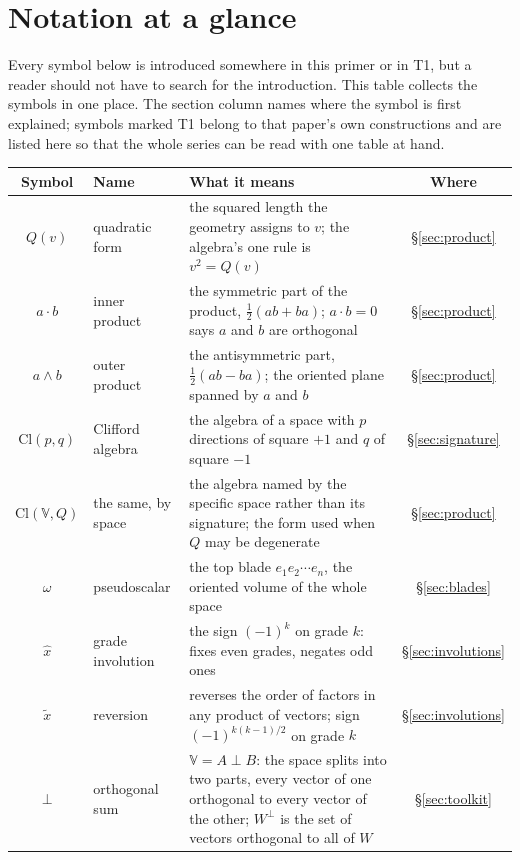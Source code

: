 \documentclass[11pt]{article}
\theoremstyle{plain}
\theoremstyle{definition}
\newcommand{\Cl}{\mathrm{Cl}}
\begin{document}
\section{Notation at a glance}\label{sec:notation}

Every symbol below is introduced somewhere in this primer or in T1, but a reader should not have to search for the introduction. This table collects the symbols in one place. The section column names where the symbol is first explained; symbols marked T1 belong to that paper's own constructions and are listed here so that the whole series can be read with one table at hand.

\begin{center}
\small
\begin{tabular}{cl>{\raggedright\arraybackslash}p{7.0cm}c}
\toprule
Symbol & Name & What it means & Where \\
\midrule
$Q(v)$ & quadratic form & the squared length the geometry assigns to $v$; the algebra's one rule is $v^2 = Q(v)$ & \S\ref{sec:product} \\
$a \cdot b$ & inner product & the symmetric part of the product, $\tfrac12(ab + ba)$; $a \cdot b = 0$ says $a$ and $b$ are orthogonal & \S\ref{sec:product} \\
$a \wedge b$ & outer product & the antisymmetric part, $\tfrac12(ab - ba)$; the oriented plane spanned by $a$ and $b$ & \S\ref{sec:product} \\
$\Cl(p,q)$ & Clifford algebra & the algebra of a space with $p$ directions of square $+1$ and $q$ of square $-1$ & \S\ref{sec:signature} \\
$\Cl(\mathbb{V}, Q)$ & the same, by space & the algebra named by the specific space rather than its signature; the form used when $Q$ may be degenerate & \S\ref{sec:product} \\
$\omega$ & pseudoscalar & the top blade $e_1 e_2 \cdots e_n$, the oriented volume of the whole space & \S\ref{sec:blades} \\
$\hat{x}$ & grade involution & the sign $(-1)^k$ on grade $k$: fixes even grades, negates odd ones & \S\ref{sec:involutions} \\
$\tilde{x}$ & reversion & reverses the order of factors in any product of vectors; sign $(-1)^{k(k-1)/2}$ on grade $k$ & \S\ref{sec:involutions} \\
$\perp$ & orthogonal sum & $\mathbb{V} = A \perp B$: the space splits into two parts, every vector of one orthogonal to every vector of the other; $W^{\perp}$ is the set of vectors orthogonal to all of $W$ & \S\ref{sec:toolkit} \\

\end{tabular}
\end{center}
\end{document}
